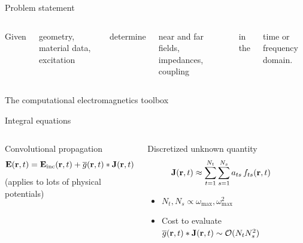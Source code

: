\documentclass[aspectratio=169, usenames, dvipsnames]{beamer}
\begin{document}
\begin{frame}{Problem statement}
  \begin{columns}
      Given
      \begin{center}
        geometry, material data, excitation
      \end{center}
      determine
      \begin{center}
        near and far fields, impedances, coupling
      \end{center}
      in the
      \begin{center}
        time or frequency domain.
      \end{center}

  \end{columns}
\end{frame}

\begin{frame}{The computational electromagnetics toolbox}
  \begin{center}
    
  \end{center}
\end{frame}

\begin{frame}{Integral equations}
  \begin{columns}
    \begin{block}{Convolutional propagation}
      \begin{equation*}
        \vb{E}(\vb{r}, t) = \vb{E}_\text{inc}(\vb{r}, t) + \overline{g}(\vb{r}, t) * \vb{J}(\vb{r}, t)
      \end{equation*}
      \hfill \tiny{(applies to lots of physical potentials)}
    \end{block}

    \begin{block}{Discretized unknown quantity}
      \begin{equation*}
        \vb{J}(\vb{r}, t) \approx \sum_{t=1}^{N_t} \sum_{s=1}^{N_s} a_{ts} \, f_{ts}(\vb{r}, t)
      \end{equation*}
      \begin{itemize}
        \item $N_t, N_s \propto \omega_\text{max}, \omega_\text{max}^2$
        \item Cost to evaluate $\overline{g}(\vb{r}, t) * \vb{J}(\vb{r}, t) \sim \mathcal{O}(N_t N_s^2)$
      \end{itemize}
    \end{block}

      \begin{center}
        
      \end{center}
  \end{columns}
\end{frame}
\end{document}
